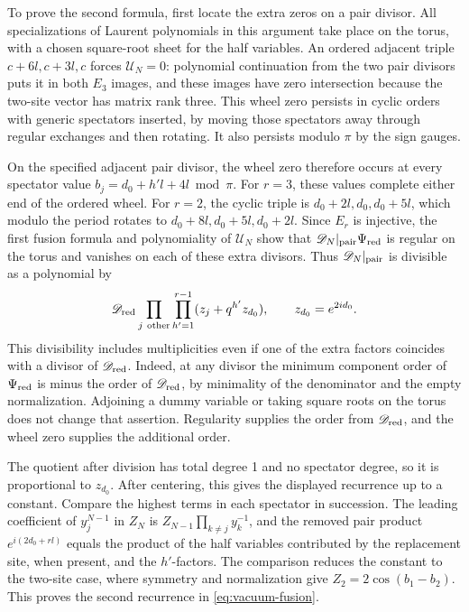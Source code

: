 To prove the second formula, first locate the extra zeros on a pair divisor. All specializations of Laurent polynomials in this argument take place on the torus, with a chosen square-root sheet for the half variables. An ordered adjacent triple \(c+6l,c+3l,c\) forces \(\mathcal U_N=0\): polynomial continuation from the two pair divisors puts it in both \(E_3\) images, and these images have zero intersection because the two-site vector has matrix rank three. This wheel zero persists in cyclic orders with generic spectators inserted, by moving those spectators away through regular exchanges and then rotating. It also persists modulo \(\pi\) by the sign gauges.

On the specified adjacent pair divisor, the wheel zero therefore occurs at every spectator value \(b_j=d_0+h'l+4l\bmod\pi\). For \(r=3\), these values complete either end of the ordered wheel. For \(r=2\), the cyclic triple is \(d_0+2l,d_0,d_0+5l\), which modulo the period rotates to \(d_0+8l,d_0+5l,d_0+2l\). Since \(E_r\) is injective, the first fusion formula and polynomiality of \(\mathcal U_N\) show that \(\mathscr D_N|_{\rm pair}\Psi_{\rm red}\) is regular on the torus and vanishes on each of these extra divisors. Thus \(\mathscr D_N|_{\rm pair}\) is divisible as a polynomial by
\[
 \mathscr D_{\rm red}\prod_{j\ {\rm other}}\prod_{h'=1}^{r-1}(z_j+q^{h'}z_{d_0}),\qquad z_{d_0}=e^{2id_0}.
\]
This divisibility includes multiplicities even if one of the extra factors coincides with a divisor of \(\mathscr D_{\rm red}\). Indeed, at any divisor the minimum component order of \(\Psi_{\rm red}\) is minus the order of \(\mathscr D_{\rm red}\), by minimality of the denominator and the empty normalization. Adjoining a dummy variable or taking square roots on the torus does not change that assertion. Regularity supplies the order from \(\mathscr D_{\rm red}\), and the wheel zero supplies the additional order.

The quotient after division has total degree 1 and no spectator degree, so it is proportional to \(z_{d_0}\). After centering, this gives the displayed recurrence up to a constant. Compare the highest terms in each spectator in succession. The leading coefficient of \(y_j^{N-1}\) in \(Z_N\) is \(Z_{N-1}\prod_{k\ne j}y_k^{-1}\), and the removed pair product \(e^{i(2d_0+rl)}\) equals the product of the half variables contributed by the replacement site, when present, and the \(h'\)-factors. The comparison reduces the constant to the two-site case, where symmetry and normalization give \(Z_2=2\cos(b_1-b_2)\). This proves the second recurrence in \eqref{eq:vacuum-fusion}.

